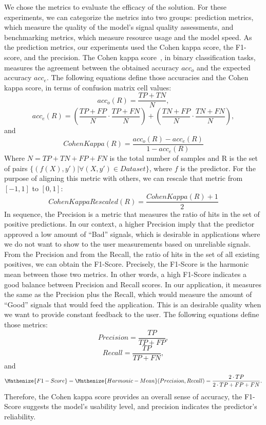 We chose the metrics to evaluate the efficacy of the solution. For these experiments, we can categorize the metrics into two groups: prediction metrics, which measure the quality of the model's signal quality assessments, and benchmarking metrics, which measure resource usage and the model speed. As the prediction metrics, our experiments used the Cohen kappa score, the F1-score, and the precision. The Cohen kappa score~\cite{CohenKappa}, in binary classification tasks, measures the agreement between the obtained accuracy $acc_o$ and the expected accuracy $acc_e$. The following equations define those accuracies and the Cohen kappa score, in terms of confusion matrix cell values:
\begin{equation} 
acc_o(R) = \frac{TP+TN}{N},
\end{equation}
\begin{equation}
acc_e(R)  = \left(\frac{TP+FP}{N} \cdot \frac{TP+FN}{N}\right) + \left(\frac{TN+FP}{N} \cdot \frac{TN+FN}{N}\right),
\end{equation}
and
\begin{equation} \label{eq:Cohen kappa}
CohenKappa(R)  = \frac{acc_o(R) - acc_e(R)}{1 - acc_e(R)} 
\end{equation}  
\noindent Where $N=TP+TN+FP+FN$ is the total number of samples and R is the set of pairs $\{(f(X),y') | \forall (X,y') \in Dataset\}$, where $f$ is the predictor. For the purpose of aligning this metric with others, we can rescale that metric from $[-1,1]$ to $[0,1]$:
\begin{equation}
CohenKappaRescaled(R) = \frac{CohenKappa(R)+1}{2} 
\end{equation}  
In sequence, the Precision is a metric that measures the ratio of hits in the set of positive predictions. In our context, a higher Precision imply that the predictor approved a low amount of ``Bad'' signals, which is desirable in applications where we do not want to show to the user measurements based on unreliable signals. From the Precision and from the Recall, the ratio of hits in the set of all existing positives, we can obtain the F1-Score. Precisely, the F1-Score is the harmonic mean between those two metrics. In other words, a high F1-Score indicates a good balance between Precision and Recall scores. In our application, it measures the same as the Precision plus the Recall, which would measure the amount of ``Good'' signals that would feed the application. This is an desirable quality when we want to provide constant feedback to the user. The following equations define those metrics:
\begin{equation} \label{eq:Precision}
Precision = \frac{TP}{TP+FP},
\end{equation}
\begin{equation} \label{eq:Recall}
Recall = \frac{TP}{TP+FN},
\end{equation}
and
\begin{equation} \label{eq:F1-Score}
\Mathenize{F1-Score}  = \Mathenize{Harmonic-Mean}(Precision,Recall) = \frac{2 \cdot TP}{2 \cdot TP + FP + FN}.
\end{equation}
\noindent Therefore, the Cohen kappa score provides an overall sense of accuracy, the F1-Score suggests the model's usability level, and precision indicates the predictor's reliability.

